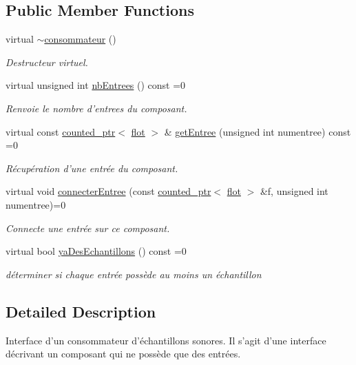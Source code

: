 \subsection*{Public Member Functions}
\begin{DoxyCompactItemize}
\item 
virtual \hyperlink{classconsommateur_a9a756f15381056cd7917a8022d405251}{$\sim$consommateur} ()
\begin{DoxyCompactList}\small\item\em Destructeur virtuel. \end{DoxyCompactList}\item 
virtual unsigned int \hyperlink{classconsommateur_aa06328f3002f14b5ff83e393e7e4761a}{nb\-Entrees} () const =0
\begin{DoxyCompactList}\small\item\em Renvoie le nombre d'entrees du composant. \end{DoxyCompactList}\item 
virtual const \hyperlink{classcounted__ptr}{counted\-\_\-ptr}$<$ \hyperlink{classflot}{flot} $>$ \& \hyperlink{classconsommateur_ab9d91275bf6355ffa417ceb379967af2}{get\-Entree} (unsigned int numentree) const =0
\begin{DoxyCompactList}\small\item\em Récupération d'une entrée du composant. \end{DoxyCompactList}\item 
virtual void \hyperlink{classconsommateur_a36b438c3e6c8e71989ec30441c821062}{connecter\-Entree} (const \hyperlink{classcounted__ptr}{counted\-\_\-ptr}$<$ \hyperlink{classflot}{flot} $>$ \&f, unsigned int numentree)=0
\begin{DoxyCompactList}\small\item\em Connecte une entrée sur ce composant. \end{DoxyCompactList}\item 
virtual bool \hyperlink{classconsommateur_a8622fe9e8e5baa1a7b152fce88b8be89}{ya\-Des\-Echantillons} () const =0
\begin{DoxyCompactList}\small\item\em déterminer si chaque entrée possède au moins un échantillon \end{DoxyCompactList}\end{DoxyCompactItemize}


\subsection{Detailed Description}
Interface d'un consommateur d'échantillons sonores. Il s'agit d'une interface décrivant un composant qui ne possède que des entrées. 

